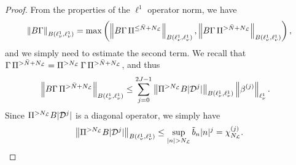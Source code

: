 \documentclass[10pt,a4paper]{amsart}
\newcommand{\D}{\mathcal{D}}
\renewcommand{\L}{\mathcal{L}}
\newcommand{\NL}{N_{\text{\tiny{$\L$}}}}
\newcommand{\bN}{\bar{N}}
\begin{document}
\begin{proof}
From the properties of the $\ell^1$ operator norm, we have
\begin{align*}
\left\Vert B\Gamma \right\Vert_{B(\ell^1_\nu,\ell^1_\nu)} = \max\left( \left\Vert B\Gamma \, \Pi^{\leq \bN+\NL} \right\Vert_{B(\ell^1_\nu,\ell^1_\nu)}, \left\Vert B\Gamma \, \Pi^{> \bN+\NL} \right\Vert_{B(\ell^1_\nu,\ell^1_\nu)}\right),
\end{align*}
and we simply need to estimate the second term. We recall that $\Gamma \, \Pi^{> \bN+\NL} = \Pi^{> \NL}\, \Gamma \, \Pi^{> \bN+\NL}$, and thus
\begin{align*}
\left\Vert B\Gamma \,\Pi^{> \bN+\NL} \right\Vert_{B(\ell^1_\nu,\ell^1_\nu)} &\leq \sum_{j=0}^{2J-1} \left\Vert \Pi^{> \NL} B \vert \D^{j}\vert \right\Vert_{B(\ell^1_\nu,\ell^1_\nu)} \left\Vert \beta^{(j)}  \right\Vert_{\ell^1_\nu}.
\end{align*}
Since $\Pi^{> \NL} B \vert \D^{j}\vert$ is a diagonal operator, we simply have
\begin{equation*}
\left\Vert \Pi^{> \NL} B \vert \D^{j}\vert \right\Vert_{B(\ell^1_\nu,\ell^1_\nu)} \leq \sup_{\vert n\vert >\NL} \tilde{b}_n \vert n\vert^j =  \chi^{(j)}_{\NL}. \qedhere
\end{equation*}
\end{proof}
\end{document}
